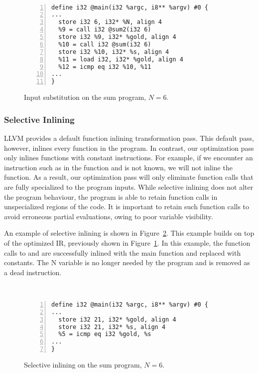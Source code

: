 \begin{figure}[htbp]\
\begin{Verbatim}[frame=single,fontsize={\scriptsize},numbers=left,numbersep=5pt,xleftmargin=10pt]
define i32 @main(i32 %argc, i8** %argv) #0 {
...
  store i32 6, i32* %N, align 4
  %9 = call i32 @sum2(i32 6)
  store i32 %9, i32* %gold, align 4
  %10 = call i32 @sum(i32 6)
  store i32 %10, i32* %s, align 4
  %11 = load i32, i32* %gold, align 4
  %12 = icmp eq i32 %10, %11
...
}
\end{Verbatim}
\caption{Input substitution on the sum program, $N=6$.}
\label{fig:input_sub_ir}
\end{figure}

\bigbreak

\subsubsection{Selective Inlining}

LLVM provides a default function inlining transformation pass.
This default pass, however, inlines every function in the program.
In contrast, our optimization pass only inlines functions with constant instructions.
For example, if we encounter an instruction such as \inlinecode{\%x = add i32 1, \%y} in the function and  is not known, we will not inline the function.
As a result, our optimization pass will only eliminate function calls that are fully specialized to the program inputs.
While selective inlining does not alter the program behaviour, the program is able to retain function calls in unspecialized regions of the code.
It is important to retain such function calls to avoid erroneous partial evaluations, owing to poor variable visibility.

An example of selective inlining is shown in Figure~\ref{fig:inlining_ir}.
This example builds on top of the optimized IR, previously shown in Figure~\ref{fig:input_sub_ir}.
In this example, the function calls to \inlinecode{sum2()} and \inlinecode{sum()} are successfully inlined with the main function and replaced with constants.
The N variable is no longer needed by the program and is removed as a dead instruction.

\begin{figure}[htbp]\
\begin{Verbatim}[frame=single,fontsize={\scriptsize},numbers=left,numbersep=5pt,xleftmargin=10pt]
define i32 @main(i32 %argc, i8** %argv) #0 {
...
  store i32 21, i32* %gold, align 4
  store i32 21, i32* %s, align 4
  %5 = icmp eq i32 %gold, %s
...
}
\end{Verbatim}
\caption{Selective inlining on the sum program, $N=6$.}
\label{fig:inlining_ir}
\end{figure}

